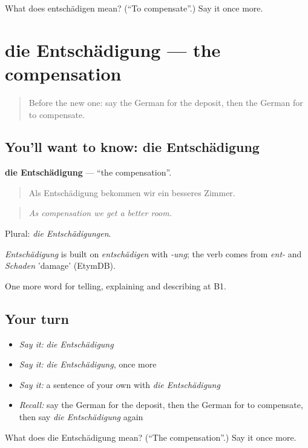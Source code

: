 \begin{tcolorbox}[breakable,colback=teal!4,colframe=teal!35!black,title={Before you move on}]
What does entschädigen mean? (\textquotedblleft{}To compensate\textquotedblright{}.) Say it once more.
\end{tcolorbox}
\section[die Entschädigung]{die Entschädigung — the compensation}

\label{lesson:GE-C432-entschaedigung}



\begin{quote}
Before the new one: say the German for the deposit, then the German for to compensate.
\end{quote}

\subsection*{You'll want to know: die Entschädigung}
\textbf{die Entschädigung} — \textquotedblleft{}the compensation\textquotedblright{}.

\begin{quote}
Als Entschädigung bekommen wir ein besseres Zimmer.
\end{quote}

\begin{quote}
\emph{As compensation we get a better room.}
\end{quote}

Plural: \emph{die Entschädigungen}.

\begin{cousinweb}
\emph{Entschädigung} is built on \emph{entschädigen} with \emph{-ung}; the verb comes from \emph{ent-} and \emph{Schaden} 'damage' (EtymDB).
\end{cousinweb}

\begin{grammarlens}[title={What you've built}]
One more word for telling, explaining and describing at B1.
\end{grammarlens}

\subsection*{Your turn}
\begin{itemize}
\raggedright
  \item \emph{Say it:} \emph{die Entschädigung}
  \item \emph{Say it:} \emph{die Entschädigung}, once more
  \item \emph{Say it:} a sentence of your own with \emph{die Entschädigung}
  \item \emph{Recall:} say the German for the deposit, then the German for to compensate, then say \emph{die Entschädigung} again
\end{itemize}

\begin{tcolorbox}[breakable,colback=teal!4,colframe=teal!35!black,title={Before you move on}]
What does die Entschädigung mean? (\textquotedblleft{}The compensation\textquotedblright{}.) Say it once more.
\end{tcolorbox}
